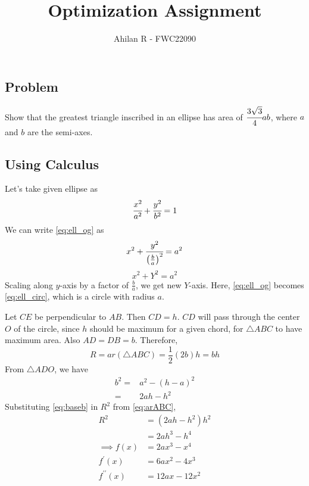\documentclass[journal,12pt,twocolumn]{IEEEtran}
\title{Optimization Assignment}
\author{Ahilan R - FWC22090}
\begin{document}
\maketitle

\subsection*{\textbf{Problem}}
Show that the greatest triangle inscribed in an ellipse has area of $\cfrac{3\sqrt{3}}{4}{}ab$, where $a$ and $b$ are the semi-axes.
\subsection*{\textbf{Using Calculus}}
Let's take given ellipse as 
\begin{equation}
		\cfrac{x^2}{a^2} + \cfrac{y^2}{b^2} = 1 \label{eq:ell_og}
\end{equation}
We can write \eqref{eq:ell_og} as
\[	x^2 + \cfrac{y^2}{\left( \frac{b}{a} \right) ^2} = a^2 \]
\begin{equation}
x^2 + Y^2 = a^2 \label{eq:ell_circ}
\end{equation}
Scaling along $y$-axis by a factor of $\frac{b}{a}$, we get new $Y$-axis. Here, \eqref{eq:ell_og} becomes \eqref{eq:ell_circ}, which is a circle with radius $a$. 

\begin{figure}[h]
\centering
\def\figwidth{\linewidth}
\def\figheight{0.35\textheight} %

\label{fig:rough}
\end{figure}

Let $CE$ be perpendicular to $AB$. Then $CD=h$. $CD$ will pass through the center $O$ of the circle, since $h$ should be maximum for a given chord, for $\triangle ABC$ to have maximum area. Also $AD=DB=b$. Therefore, 
\begin{equation}
R = ar(\triangle ABC)= \frac{1}{2}(2b)h= bh \label{eq:arABC}
\end{equation}
From $\triangle ADO$, we have
\begin{align}
		b^2 =& a^2- (h-a)^2 \nonumber \\ %
		=& 2ah-h^2 \label{eq:baseb}
\end{align}
Substituting \eqref{eq:baseb} in $R^2$ from \eqref{eq:arABC},
\begin{align}
		R^2 &= (2ah-h^2)h^2 \nonumber \\
		&= 2ah^3-h^4 \\
		\implies f(x) &= 2ax^3-x^4 \label{eq:fofx} \\
		f^{\prime}(x) &= 6ax^2 -4x^3 \label{eq:fprime} \\
		f^{\prime\prime}(x) &= 12ax -12x^2 \label{eq:fdprime}
\end{align}
\end{document}
